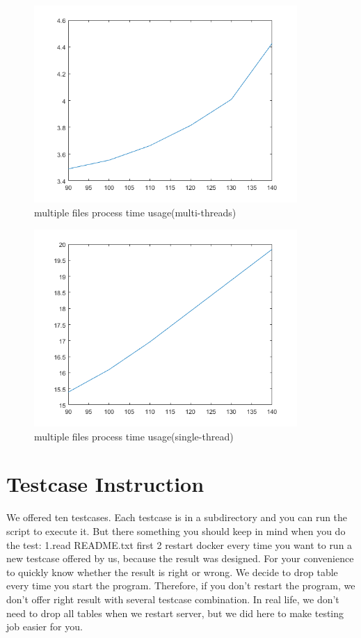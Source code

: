 \documentclass{article}
\begin{document}
\begin{figure}[h!]
\centering
\includegraphics[width=100mm]{mfg}
\caption{multiple files process time usage(multi-threads)}
\label{fig:method}
\end{figure}
\begin{figure}[h!]
\centering
\includegraphics[width=100mm]{sfg}
\caption{multiple files process time usage(single-thread)}
\label{fig:method}
\end{figure}
%
\section{Testcase Instruction}
We offered ten testcases. Each testcase is in a subdirectory and you can run the script to execute it. But there something you should keep in mind when you do the test: 1.read README.txt first 2 restart docker every time you want to run a new testcase offered by us, because the result was designed. For your convenience to quickly know whether the result is right or wrong. We decide to drop table every time you start the program. Therefore, if you don't restart the program, we don't offer right result with several testcase combination. In real life, we don't need to drop all tables when we restart server, but we did here to make testing job easier for you.

%
\end{document}
